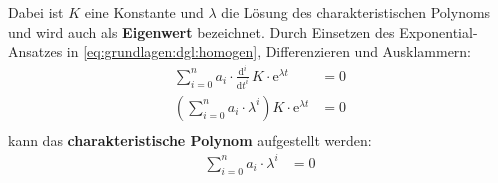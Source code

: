 \begin{frame}
{    %

    Dabei ist $K$ eine Konstante und $\lambda$ die Lösung des charakteristischen Polynoms 
    und wird auch als \textbf{Eigenwert} bezeichnet. 
    Durch Einsetzen des Exponential-Ansatzes in \ref{eq:grundlagen:dgl:homogen}, Differenzieren und Ausklammern:
    \begin{align}
        \sum_{i=0}^{n} a_i \cdot \frac{\mathrm{d}^{i}}{\mathrm{d}t^{i}}\, K \cdot \mathrm{e}^{\lambda t} &= 0 \nonumber\\[2pt]
        \left(\sum_{i=0}^{n} a_i \cdot \lambda^i \right) K \cdot \mathrm{e}^{\lambda t} &= 0 \nonumber\\[4pt]
    \end{align}
    kann das \textbf{charakteristische Polynom} aufgestellt werden:
    \begin{align}
        \sum_{i=0}^{n} a_i \cdot \lambda^i &= 0
    \end{align}

}
\end{frame}
